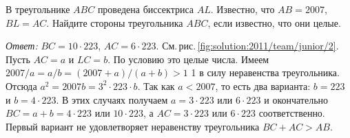 В треугольнике $ABC$ проведена биссектриса $AL$.
Известно, что $AB = 2007$, $BL = AC$.
Найдите стороны треугольника $ABC$, если известно, что они целые.

%
\label{solution:2011/team/junior/2}%
\emph{Ответ:} $BC = 10 \cdot 223$, $AC = 6 \cdot 223$.
См.\,рис.\,\ref{fig:solution:2011/team/junior/2}.
Пусть $AC = a$ и $LC = b$.
По условию это целые числа.
Имеем $2007 / a = a / b = (2007 + a) / (a + b) > 1$ 1 в силу неравенства
треугольника.
Отсюда $a^2 = 2007 b = 3^2 \cdot 223 \cdot b$.
Так как  $a < 2007$, то есть два варианта:
$b = 223$ и $b = 4 \cdot 223$.
В этих случаях получаем $a = 3 \cdot 223$ или $6 \cdot 223$ и окончательно
$BC = a + b = 4 \cdot 223$ или $10 \cdot 223$, а $AC = 3 \cdot 223$ или
$6 \cdot 223$ соответственно.
Первый вариант не удовлетворяет неравенству треугольника $BC + AC > AB$.

